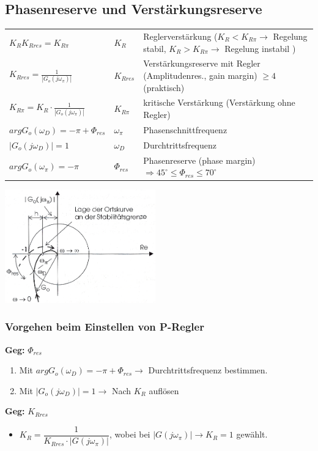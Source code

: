 		
	\subsection{Phasenreserve und Verstärkungsreserve }
		\begin{tabular}{l|ll}
			$K_RK_{Rres}=K_{R\pi}$ & $K_R$ & Reglerverstärkung ($K_R < K_{R\pi} \rightarrow$ Regelung stabil, $K_R > K_{R\pi} \rightarrow$ Regelung
			instabil	) \\
			$K_{Rres}=\frac{1}{\left| G_o(j\omega_{\pi})\right|}$ & $K_{Rres}$ & 	Verstärkungsreserve mit Regler (Amplitudenres., gain margin) $\geq 4$ (praktisch) \\
			$K_{R\pi} = K_R \cdot \frac{1}{|G_o(j\omega_\pi)|}$ & $K_{R\pi}$ & kritische Verstärkung (Verstärkung ohne Regler) \\
			$argG_o(\omega_D)=-\pi+\Phi_{res}$ & $\omega_\pi$ & Phasenschnittfrequenz\\
			$|G_o(j\omega_D)|=1$ & $\omega_D$ & Durchtrittsfrequenz \\
			$argG_o(\omega_\pi)=-\pi$ & $\Phi_{res}$ & Phasenreserve (phase margin) $\Rightarrow 45^{\circ} \leq \Phi_{res} \leq 70^{\circ}$
		\end{tabular}
		\begin{minipage}{7cm}
			\includegraphics[width=6.5cm]{./images/phasenreserve.png}
		\end{minipage}
		\begin{minipage}{11cm}
			\subsubsection{Vorgehen beim Einstellen von P-Regler }
			\textbf{Geg:} $\Phi_{res}$
			\begin{enumerate}
				\item Mit $argG_o(\omega_D) = -\pi + \Phi_{res} \rightarrow$ Durchtrittsfrequenz bestimmen.
				\item Mit $|G_o(j\omega_D)| = 1 \rightarrow$  Nach $K_{R}$ auflösen 
			\end{enumerate}
			\vspace{0.5cm}
			\textbf{Geg:} $K_{Rres}$
			\begin{itemize}
				\item $K_R = \dfrac{1}{K_{Rres} \cdot |G(j\omega_\pi)|}$, wobei bei $|G(j\omega_\pi)| \rightarrow K_R = 1$ gewählt.
			\end{itemize}
			
		\end{minipage}
        
